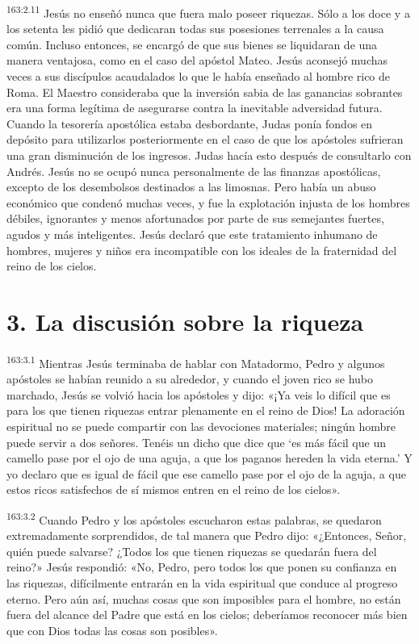 \par 
\textsuperscript{163:2.11} Jesús no enseñó nunca que fuera malo poseer riquezas. Sólo a los doce y a los setenta les pidió que dedicaran todas sus posesiones terrenales a la causa común. Incluso entonces, se encargó de que sus bienes se liquidaran de una manera ventajosa, como en el caso del apóstol Mateo. Jesús aconsejó muchas veces a sus discípulos acaudalados lo que le había enseñado al hombre rico de Roma. El Maestro consideraba que la inversión sabia de las ganancias sobrantes era una forma legítima de asegurarse contra la inevitable adversidad futura. Cuando la tesorería apostólica estaba desbordante, Judas ponía fondos en depósito para utilizarlos posteriormente en el caso de que los apóstoles sufrieran una gran disminución de los ingresos. Judas hacía esto después de consultarlo con Andrés. Jesús no se ocupó nunca personalmente de las finanzas apostólicas, excepto de los desembolsos destinados a las limosnas. Pero había un abuso económico que condenó muchas veces, y fue la explotación injusta de los hombres débiles, ignorantes y menos afortunados por parte de sus semejantes fuertes, agudos y más inteligentes. Jesús declaró que este tratamiento inhumano de hombres, mujeres y niños era incompatible con los ideales de la fraternidad del reino de los cielos.

\section*{3. La discusión sobre la riqueza}
\par 
\textsuperscript{163:3.1} Mientras Jesús terminaba de hablar con Matadormo, Pedro y algunos apóstoles se habían reunido a su alrededor, y cuando el joven rico se hubo marchado, Jesús se volvió hacia los apóstoles y dijo: «¡Ya veis lo difícil que es para los que tienen riquezas entrar plenamente en el reino de Dios! La adoración espiritual no se puede compartir con las devociones materiales; ningún hombre puede servir a dos señores. Tenéis un dicho que dice que `es más fácil que un camello pase por el ojo de una aguja, a que los paganos hereden la vida eterna.' Y yo declaro que es igual de fácil que ese camello pase por el ojo de la aguja, a que estos ricos satisfechos de sí mismos entren en el reino de los cielos».

\par 
\textsuperscript{163:3.2} Cuando Pedro y los apóstoles escucharon estas palabras, se quedaron extremadamente sorprendidos, de tal manera que Pedro dijo: «¿Entonces, Señor, quién puede salvarse? ¿Todos los que tienen riquezas se quedarán fuera del reino?» Jesús respondió: «No, Pedro, pero todos los que ponen su confianza en las riquezas, difícilmente entrarán en la vida espiritual que conduce al progreso eterno. Pero aún así, muchas cosas que son imposibles para el hombre, no están fuera del alcance del Padre que está en los cielos; deberíamos reconocer más bien que con Dios todas las cosas son posibles».

